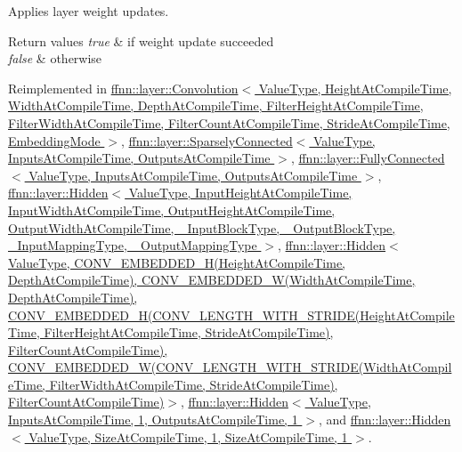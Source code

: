 Applies layer weight updates. 


\begin{DoxyRetVals}{Return values}
{\em true} & if weight update succeeded \\
\hline
{\em false} & otherwise \\
\hline
\end{DoxyRetVals}


Reimplemented in \hyperlink{classffnn_1_1layer_1_1_convolution_ad0e91ef030bfa825af0aa0a5ab54ec57}{ffnn\-::layer\-::\-Convolution$<$ Value\-Type, Height\-At\-Compile\-Time, Width\-At\-Compile\-Time, Depth\-At\-Compile\-Time, Filter\-Height\-At\-Compile\-Time, Filter\-Width\-At\-Compile\-Time, Filter\-Count\-At\-Compile\-Time, Stride\-At\-Compile\-Time, Embedding\-Mode $>$}, \hyperlink{classffnn_1_1layer_1_1_sparsely_connected_afa564d528e74917231da2d038f76e3f1}{ffnn\-::layer\-::\-Sparsely\-Connected$<$ Value\-Type, Inputs\-At\-Compile\-Time, Outputs\-At\-Compile\-Time $>$}, \hyperlink{classffnn_1_1layer_1_1_fully_connected_a3194dde96feea7d008cc0c27f30cc805}{ffnn\-::layer\-::\-Fully\-Connected$<$ Value\-Type, Inputs\-At\-Compile\-Time, Outputs\-At\-Compile\-Time $>$}, \hyperlink{classffnn_1_1layer_1_1_hidden_ace039624b0b202413e068fd523f26884}{ffnn\-::layer\-::\-Hidden$<$ Value\-Type, Input\-Height\-At\-Compile\-Time, Input\-Width\-At\-Compile\-Time, Output\-Height\-At\-Compile\-Time, Output\-Width\-At\-Compile\-Time, \-\_\-\-Input\-Block\-Type, \-\_\-\-Output\-Block\-Type, \-\_\-\-Input\-Mapping\-Type, \-\_\-\-Output\-Mapping\-Type $>$}, \hyperlink{classffnn_1_1layer_1_1_hidden_ace039624b0b202413e068fd523f26884}{ffnn\-::layer\-::\-Hidden$<$ Value\-Type, C\-O\-N\-V\-\_\-\-E\-M\-B\-E\-D\-D\-E\-D\-\_\-\-H(\-Height\-At\-Compile\-Time, Depth\-At\-Compile\-Time), C\-O\-N\-V\-\_\-\-E\-M\-B\-E\-D\-D\-E\-D\-\_\-\-W(\-Width\-At\-Compile\-Time, Depth\-At\-Compile\-Time), C\-O\-N\-V\-\_\-\-E\-M\-B\-E\-D\-D\-E\-D\-\_\-\-H(\-C\-O\-N\-V\-\_\-\-L\-E\-N\-G\-T\-H\-\_\-\-W\-I\-T\-H\-\_\-\-S\-T\-R\-I\-D\-E(\-Height\-At\-Compile\-Time, Filter\-Height\-At\-Compile\-Time, Stride\-At\-Compile\-Time), Filter\-Count\-At\-Compile\-Time), C\-O\-N\-V\-\_\-\-E\-M\-B\-E\-D\-D\-E\-D\-\_\-\-W(\-C\-O\-N\-V\-\_\-\-L\-E\-N\-G\-T\-H\-\_\-\-W\-I\-T\-H\-\_\-\-S\-T\-R\-I\-D\-E(\-Width\-At\-Compile\-Time, Filter\-Width\-At\-Compile\-Time, Stride\-At\-Compile\-Time), Filter\-Count\-At\-Compile\-Time)$>$}, \hyperlink{classffnn_1_1layer_1_1_hidden_ace039624b0b202413e068fd523f26884}{ffnn\-::layer\-::\-Hidden$<$ Value\-Type, Inputs\-At\-Compile\-Time, 1, Outputs\-At\-Compile\-Time, 1 $>$}, and \hyperlink{classffnn_1_1layer_1_1_hidden_ace039624b0b202413e068fd523f26884}{ffnn\-::layer\-::\-Hidden$<$ Value\-Type, Size\-At\-Compile\-Time, 1, Size\-At\-Compile\-Time, 1 $>$}.



